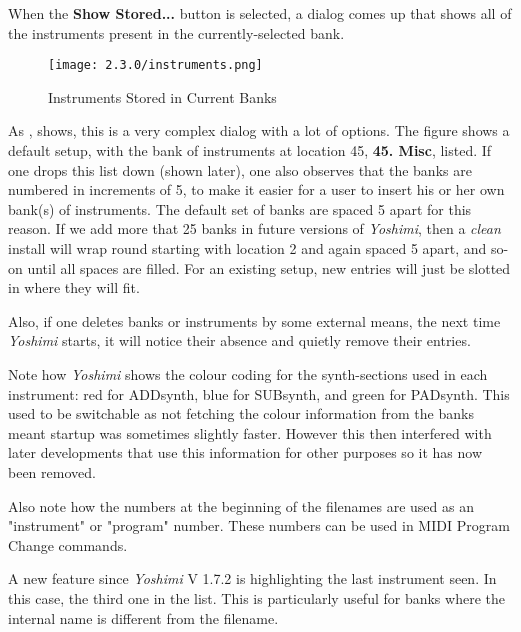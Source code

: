    When the \textbf{Show Stored...} button is selected, a dialog comes
   up that shows all of the instruments present in the currently-selected
   bank.

\begin{figure}[H]
   \centering
   \texttt{[image: 2.3.0/instruments.png]}
   \caption[Show Stored Instruments]{Instruments Stored in Current Banks}
   \label{fig:instruments_show_stored}
\end{figure}

   As ,
   shows, this is a very complex dialog with a lot of options.
   The figure shows a default setup, with the bank of instruments at location
   45, \textbf{45. Misc}, listed.
   If one drops this list down (shown later), one also observes that the banks
   are numbered in increments of 5, to make it easier for a user to insert his
   or her own bank(s) of instruments. The default set of banks are spaced 5
   apart for this reason. If we add more that 25 banks in future versions of
   \textsl{Yoshimi}, then a \textsl{clean} install will wrap round starting with
   location 2 and again spaced 5 apart, and so-on until all spaces are filled.
   For an existing setup, new entries will just be slotted in where they
   will fit.

   Also, if one deletes banks or instruments by some external means, the next
   time \textsl{Yoshimi} starts, it will notice their absence and quietly
   remove their entries.

   Note how \textsl{Yoshimi} shows the colour coding for the
   synth-sections used in each instrument:
   red for ADDsynth, blue for SUBsynth, and green for PADsynth.
   This used to be switchable as not fetching the colour information from the
   banks meant startup was sometimes slightly faster. However this then
   interfered with later developments that use this information for other
   purposes so it has now been removed.

   Also note how the numbers at the beginning of the filenames are used as
   an "instrument" or "program" number.  These numbers can be used in MIDI
   Program Change commands.

   A new feature since \textsl{Yoshimi} V 1.7.2 is highlighting the last
   instrument seen. In this case, the third one in the list. This is
   particularly useful for banks where the internal name is different from the
   filename.

